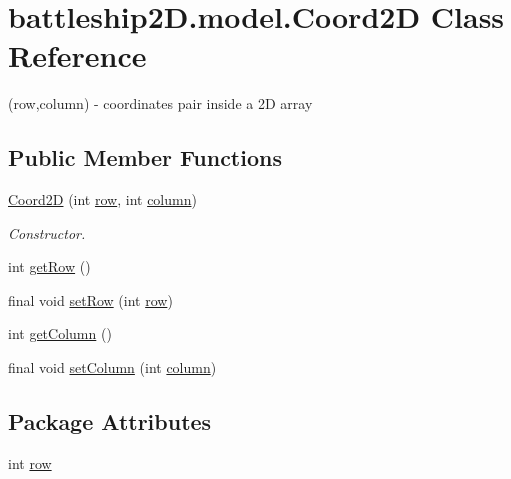 \hypertarget{classbattleship2D_1_1model_1_1Coord2D}{\section{battleship2\-D.\-model.\-Coord2\-D Class Reference}
\label{classbattleship2D_1_1model_1_1Coord2D}
}


(row,column) -\/ coordinates pair inside a 2\-D array  


\subsection*{Public Member Functions}
\begin{DoxyCompactItemize}
\item 
\hyperlink{classbattleship2D_1_1model_1_1Coord2D_ae46741217f55556ecb5d04d63eef7f71}{Coord2\-D} (int \hyperlink{classbattleship2D_1_1model_1_1Coord2D_a6f65494fedcc38fc14183bd1b84869a1}{row}, int \hyperlink{classbattleship2D_1_1model_1_1Coord2D_ab75c922fc86f340e5722297fa25a3bd8}{column})
\begin{DoxyCompactList}\small\item\em Constructor. \end{DoxyCompactList}\item 
int \hyperlink{classbattleship2D_1_1model_1_1Coord2D_a691c1fc2511b9c6bc888a8e17c8cc62e}{get\-Row} ()
\item 
final void \hyperlink{classbattleship2D_1_1model_1_1Coord2D_a0be3424c423bd438cdcceae7b829353c}{set\-Row} (int \hyperlink{classbattleship2D_1_1model_1_1Coord2D_a6f65494fedcc38fc14183bd1b84869a1}{row})
\item 
int \hyperlink{classbattleship2D_1_1model_1_1Coord2D_a36cde8143f4ba0dda88b5fbbb56076ff}{get\-Column} ()
\item 
final void \hyperlink{classbattleship2D_1_1model_1_1Coord2D_a9152c6f9e7d7600483d4b36c89acefce}{set\-Column} (int \hyperlink{classbattleship2D_1_1model_1_1Coord2D_ab75c922fc86f340e5722297fa25a3bd8}{column})
\end{DoxyCompactItemize}
\subsection*{Package Attributes}
\begin{DoxyCompactItemize}
\item 
int \hyperlink{classbattleship2D_1_1model_1_1Coord2D_a6f65494fedcc38fc14183bd1b84869a1}{row}
\end{DoxyCompactItemize}
